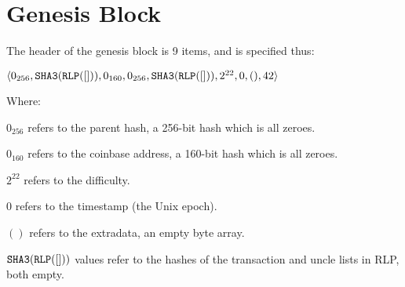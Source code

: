\documentclass[9pt,oneside]{amsart}
\begin{document}

\section{Genesis Block}\label{app:genesis}

The header of the genesis block is 9 items, and is specified thus:

$\langle 0_{256}, \mathtt{\tiny SHA3}(\mathtt{\tiny RLP}([])), 0_{160}, 0_{256}, \mathtt{\tiny SHA3}(\mathtt{\tiny RLP}([])), 2^{22}, 0, (), 42 \rangle$

Where:

$0_{256}$ refers to the parent hash, a 256-bit hash which is all zeroes.

$0_{160}$ refers to the coinbase address, a 160-bit hash which is all zeroes.

$2^{22}$ refers to the difficulty.

0 refers to the timestamp (the Unix epoch).

$()$ refers to the extradata, an empty byte array.

$\mathtt{\tiny SHA3}(\mathtt{\tiny RLP}([]))$ values refer to the hashes of the transaction and uncle lists in RLP, both empty.
\end{document}
